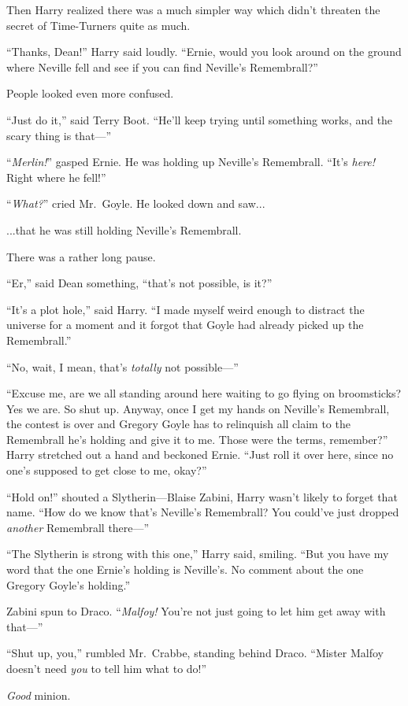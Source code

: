 Then Harry realized there was a much simpler way which didn’t threaten the secret of Time-Turners quite as much.

“Thanks, Dean!” Harry said loudly. “Ernie, would you look around on the ground where Neville fell and see if you can find Neville’s Remembrall?”

People looked even more confused.

“Just do it,” said Terry Boot. “He’ll keep trying until something works, and the scary thing is that—”

“\emph{Merlin!}” gasped Ernie. He was holding up Neville’s Remembrall. “It’s \emph{here!} Right where he fell!”

“\emph{What?}” cried Mr.~Goyle. He looked down and saw...

...that he was still holding Neville’s Remembrall.

There was a rather long pause.

“Er,” said Dean something, “that’s not possible, is it?”

“It’s a plot hole,” said Harry. “I made myself weird enough to distract the universe for a moment and it forgot that Goyle had already picked up the Remembrall.”

“No, wait, I mean, that’s \emph{totally} not possible—”

“Excuse me, are we all standing around here waiting to go flying on broomsticks? Yes we are. So shut up. Anyway, once I get my hands on Neville’s Remembrall, the contest is over and Gregory Goyle has to relinquish all claim to the Remembrall he’s holding and give it to me. Those were the terms, remember?” Harry stretched out a hand and beckoned Ernie. “Just roll it over here, since no one’s supposed to get close to me, okay?”

“Hold on!” shouted a Slytherin—Blaise Zabini, Harry wasn’t likely to forget that name. “How do we know that’s Neville’s Remembrall? You could’ve just dropped \emph{another} Remembrall there—”

“The Slytherin is strong with this one,” Harry said, smiling. “But you have my word that the one Ernie’s holding is Neville’s. No comment about the one Gregory Goyle’s holding.”

Zabini spun to Draco. “\emph{Malfoy!} You’re not just going to let him get away with that—”

“Shut up, you,” rumbled Mr.~Crabbe, standing behind Draco. “Mister Malfoy doesn’t need \emph{you} to tell him what to do!”

\emph{Good} minion.

